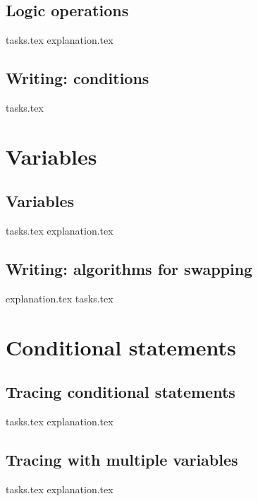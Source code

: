     \section{Logic operations}
    {tasks.tex}        \newpage
    {explanation.tex}     \newpage

    \section{Writing: conditions}
    {tasks.tex}           \newpage

    \chapter{Variables}
    \newpage

    \section{Variables}
    {tasks.tex}         \newpage
    {explanation.tex}      \newpage

    \section{Writing: algorithms for swapping}
    {explanation.tex}           \newpage
    {tasks.tex}                 \newpage

    \chapter{Conditional statements}
    \newpage

    \section{Tracing conditional statements}
    {tasks.tex}        \newpage
    {explanation.tex}     \newpage

    \section{Tracing with multiple variables}
    {tasks.tex}         \newpage
    {explanation.tex}      \newpage

